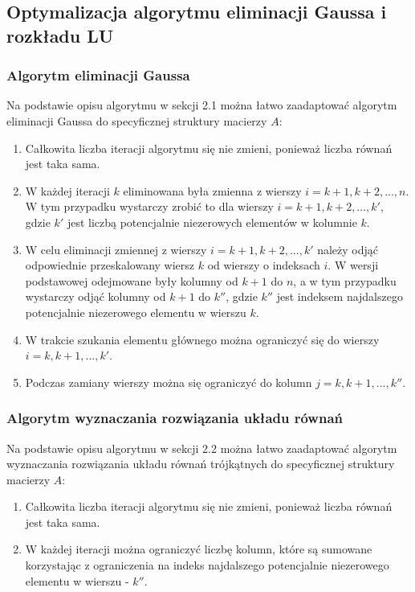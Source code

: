 \documentclass{article}
\begin{document}
\subsection{Optymalizacja algorytmu eliminacji Gaussa i rozkładu LU}
\subsubsection{Algorytm eliminacji Gaussa}
Na podstawie opisu algorytmu w sekcji 2.1 można łatwo zaadaptować algorytm eliminacji Gaussa do specyficznej struktury macierzy $A$:
\begin{enumerate}
    \item Całkowita liczba iteracji algorytmu się nie zmieni, ponieważ liczba równań jest taka sama.
    \item W każdej iteracji $k$ eliminowana była zmienna z wierszy $i = k+1, k+2, ..., n$. W tym przypadku wystarczy zrobić to dla wierszy $i = k+1, k+2, ..., k'$, gdzie $k'$ jest liczbą potencjalnie niezerowych elementów w kolumnie $k$.
    \item W celu eliminacji zmiennej z wierszy $i = k+1, k+2, ..., k'$ należy odjąć odpowiednie przeskalowany wiersz $k$ od wierszy o indeksach $i$. 
    W wersji podstawowej odejmowane były kolumny od $k+1$ do $n$, a w tym przypadku wystarczy odjąć kolumny od $k+1$ do $k''$, gdzie $k''$ jest indeksem najdalszego potencjalnie niezerowego elementu w wierszu $k$.
    \item W trakcie szukania elementu głównego można ograniczyć się do wierszy $i = k, k+1, ..., k'$.
    \item Podczas zamiany wierszy można się ograniczyć do kolumn $j = k, k+1, ..., k''$.
\end{enumerate}

\subsubsection{Algorytm wyznaczania rozwiązania układu równań}
Na podstawie opisu algorytmu w sekcji 2.2 można łatwo zaadaptować algorytm wyznaczania rozwiązania układu równań trójkątnych do specyficznej struktury macierzy $A$:
\begin{enumerate}
    \item Całkowita liczba iteracji algorytmu się nie zmieni, ponieważ liczba równań jest taka sama.
    \item W każdej iteracji można ograniczyć liczbę kolumn, które są sumowane korzystając z ograniczenia na indeks najdalszego potencjalnie niezerowego elementu w wierszu - $k''$.
\end{enumerate}
\end{document}
